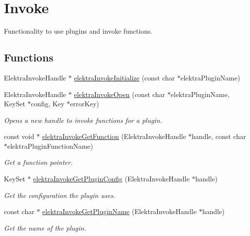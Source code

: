 \hypertarget{group__invoke}{}\section{Invoke}
\label{group__invoke}


Functionality to use plugins and invoke functions.  


\subsection*{Functions}
\begin{DoxyCompactItemize}
\item 
Elektra\+Invoke\+Handle $\ast$ \hyperlink{group__invoke_gaae89e2497eba478be2043f1b25adbb3c}{elektra\+Invoke\+Initialize} (const char $\ast$elektra\+Plugin\+Name)
\item 
Elektra\+Invoke\+Handle $\ast$ \hyperlink{group__invoke_ga3eb20131e9a8fc9a6cebf126927c09bc}{elektra\+Invoke\+Open} (const char $\ast$elektra\+Plugin\+Name, Key\+Set $\ast$config, Key $\ast$error\+Key)
\begin{DoxyCompactList}\small\item\em Opens a new handle to invoke functions for a plugin. \end{DoxyCompactList}\item 
const void $\ast$ \hyperlink{group__invoke_ga4531a643a71a63c19c94d87bd8d0b40f}{elektra\+Invoke\+Get\+Function} (Elektra\+Invoke\+Handle $\ast$handle, const char $\ast$elektra\+Plugin\+Function\+Name)
\begin{DoxyCompactList}\small\item\em Get a function pointer. \end{DoxyCompactList}\item 
Key\+Set $\ast$ \hyperlink{group__invoke_gafc090b80f3ba846bf3c3fd8ccd34f2f5}{elektra\+Invoke\+Get\+Plugin\+Config} (Elektra\+Invoke\+Handle $\ast$handle)
\begin{DoxyCompactList}\small\item\em Get the configuration the plugin uses. \end{DoxyCompactList}\item 
const char $\ast$ \hyperlink{group__invoke_ga13bd3afe428624d459239df73641d769}{elektra\+Invoke\+Get\+Plugin\+Name} (Elektra\+Invoke\+Handle $\ast$handle)
\begin{DoxyCompactList}\small\item\em Get the name of the plugin. \end{DoxyCompactList}\item 

\end{DoxyCompactItemize}
